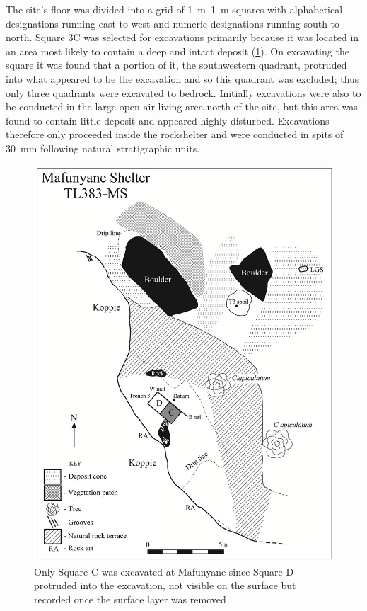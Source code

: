 The site’s floor was  divided into a grid of \SIrange{1}{1}{\meter} squares with alphabetical designations running east to west and numeric designations running south to north. 
Square 3C was selected for excavations primarily because it was located in an area most likely to contain a deep and intact deposit (\cref{fig:Forssman-Figure02}). 
On excavating the square it was found that a portion of it, the southwestern quadrant, protruded into what appeared to be the \textcite{Walker_1994} excavation and so this quadrant was excluded; 
thus only three quadrants were excavated to bedrock. Initially excavations were also to be conducted in the large open-air living area north of the site, but this area was found to contain little deposit and appeared highly disturbed. 
Excavations therefore only proceeded inside the rockshelter and were conducted in spits of \SI{30}{\milli\meter} following natural stratigraphic units.

	\begin{figure}
		\includegraphics[width=\linewidth]{figures/Forssman-Figure02}
		\caption{Only Square C was excavated at Mafunyane since Square D protruded into the \textcite{Walker_1994} excavation, not visible on the surface but recorded once the surface layer was removed \parencite[from][96]{Forssman_2014a}.}
		\label{fig:Forssman-Figure02}
	\end{figure}

